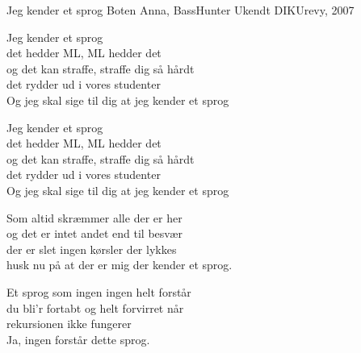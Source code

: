\begin{song}{Jeg kender et sprog}
  {} %
  {Boten Anna, BassHunter} %
  {Ukendt} %
  {DIKUrevy, 2007} %
  {\NotCCLIed} %

  \begin{SBChorus}
    Jeg kender et sprog \\
    det hedder ML, ML hedder det \\
    og det kan straffe, straffe dig så hårdt \\
    det rydder ud i vores studenter \\
    Og jeg skal sige til dig at jeg kender et sprog \\
  \end{SBChorus}
  
  \begin{SBChorus}
    Jeg kender et sprog \\
    det hedder ML, ML hedder det \\
    og det kan straffe, straffe dig så hårdt \\
    det rydder ud i vores studenter \\
    Og jeg skal sige til dig at jeg kender et sprog \\
  \end{SBChorus}
  
  \begin{SBVerse}
    Som altid skræmmer alle der er her \\
    og det er intet andet end til besvær \\
    der er slet ingen kørsler der lykkes \\
    husk nu på at der er mig der kender et sprog. \\
  \end{SBVerse}
  
  \begin{SBVerse}
    Et sprog som ingen ingen helt forstår \\
    du bli'r fortabt og helt forvirret når \\
    rekursionen ikke fungerer \\
    Ja, ingen forstår dette sprog. \\
  \end{SBVerse}
  

\end{song}
